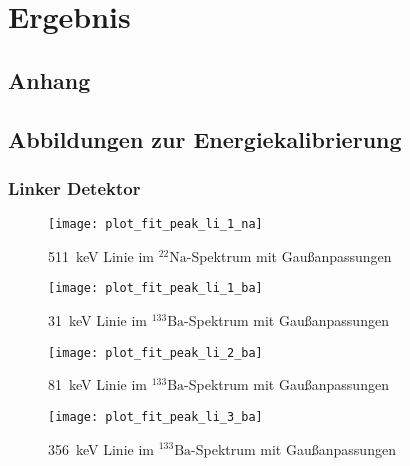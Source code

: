 \documentclass[11pt, ngerman, fleqn, DIV=15, headinclude, BCOR=2cm]{scrreprt}
\begin{document}
\chapter{Ergebnis}



\begin{appendix}
\chapter{Anhang}

\section{Abbildungen zur Energiekalibrierung} \label{anhang-energiekalibrierung}

\subsection{Linker Detektor}
\begin{figure}[h]
    \centering
    \texttt{[image: plot\_fit\_peak\_li\_1\_na]}
    \caption{%
	    \SI{511}{\kilo\electronvolt} Linie im $^{22}\text{Na}$-Spektrum mit
	    Gaußanpassungen
   }
    \label{fig:plot_fit_peak_li_1_Na}
\end{figure}
\begin{figure}[h]
    \centering
    \texttt{[image: plot\_fit\_peak\_li\_1\_ba]}
    \caption{%
	    \SI{31}{\kilo\electronvolt} Linie im $^{133}\text{Ba}$-Spektrum mit
	    Gaußanpassungen
   }
    \label{fig:plot_fit_peak_li_1_Ba}
\end{figure}
\begin{figure}[h]
    \centering
    \texttt{[image: plot\_fit\_peak\_li\_2\_ba]}
    \caption{%
	    \SI{81}{\kilo\electronvolt} Linie im $^{133}\text{Ba}$-Spektrum mit
	    Gaußanpassungen
   }
    \label{fig:plot_fit_peak_li_2_Ba}
\end{figure}
\begin{figure}[h]
    \centering
    \texttt{[image: plot\_fit\_peak\_li\_3\_ba]}
    \caption{%
	    \SI{356}{\kilo\electronvolt} Linie im $^{133}\text{Ba}$-Spektrum mit
	    Gaußanpassungen
   }
    \label{fig:plot_fit_peak_li_3_Ba}
\end{figure}
\clearpage


\end{appendix}
\end{document}
